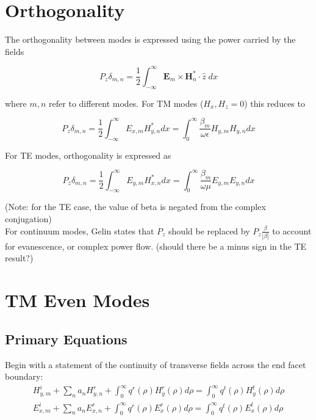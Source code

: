 \documentclass[11pt, oneside]{article}   	%
\begin{document}
\section{Orthogonality}

The orthogonality between modes is expressed using the power carried by the fields

\begin{equation}
P_{z} \delta_{m,n} = \frac{1}{2} \int_{-\infty}^{\infty} \mathbf{E}_{m} \times \mathbf{H}_{n}^{*} \cdot \hat{z} \; dx
\end{equation}

\noindent where $m,n$ refer to different modes. For TM modes ($H_{x}, H_{z} = 0$) this reduces to 

\begin{equation}
P_{z} \delta_{m,n} = \frac{1}{2} \int_{-\infty}^{\infty} E_{x,m} H_{y,n}^{*} dx = \int_{0}^{\infty} \frac{\beta_{m}}{\omega \epsilon}  H_{y,m} H_{y,n} dx
\label{eq:orthogonality-tm}
\end{equation}

\noindent For TE modes, orthogonality is expressed as 

\begin{equation}
P_{z} \delta_{m,n} = \frac{1}{2} \int_{-\infty}^{\infty} E_{y,m} H_{x,n}^{*} dx = \int_{0}^{\infty} \frac{\beta_{m}}{\omega \mu}  E_{y,m} E_{y,n} dx
\label{eq:orthogonality-te}
\end{equation}

\noindent (Note: for the TE case, the value of beta is negated from the complex conjugation) \\

\noindent For continuum modes, Gelin states that $P_{z}$ should be replaced by $P_z \frac{\beta}{|\beta|}$ to account for evanescence, or complex power flow. (should there be a minus sign in the TE result?)


\newpage
\section{TM Even Modes}
\subsection{Primary Equations}

Begin with a statement of the continuity of transverse fields across the end facet boundary:
\begin{align}
H_{y,m}^{i} + \sum_{n} a_{n} H_{y,n}^{r} + \int_{0}^{\infty} q^{r} (\rho) H_{y}^{r} (\rho) d\rho = \int_{0}^{\infty} q^{t} (\rho) H_{y}^{t} (\rho) d\rho \\
E_{x,m}^{i} + \sum_{n} a_{n} E_{x,n}^{r} + \int_{0}^{\infty} q^{r} (\rho) E_{x}^{r} (\rho) d\rho = \int_{0}^{\infty} q^{t} (\rho) E_{x}^{t} (\rho) d\rho \label{eq:ex-continuity}
\end{align}
\end{document}
